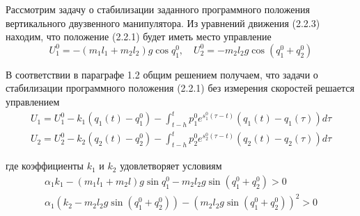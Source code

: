 Рассмотрим задачу о стабилизации заданного программного положения вертикального двузвенного манипулятора. Из уравнений движения (2.2.3) находим, что положение (2.2.1) будет иметь место управление $$U_1^0 = -(m_1 l_1 + m_2 l_2) g \cos q_1^0, \quad U_2^0 = -m_2 l_2 g \cos (q_1^0 + q_2^0)$$

В соответствии в параграфе 1.2 общим решением получаем, что задачи о стабилизации программного положения (2.2.1) без измерения скоростей решается управлением 
$$
\begin{array}{l}
\displaystyle U_1 = U_1^0 - k_1 (q_1(t) - q_1^0) - \int_{t-h}^{t} p_1^0 e^{s_1^0 (\tau - t)} (q_1(t) - q_1(\tau)) d \tau\\
\displaystyle U_2 = U_2^0 - k_2 (q_2(t) - q_2^0) - \int_{t-h}^{t} p_2^0 e^{s_2^0 (\tau - t)} (q_2(t) - q_2(\tau)) d \tau
\end{array}
$$

где коэффициенты $k_1$ и $k_2$ удовлетворяет условиям 
$$
\begin{array}{c}
\alpha_1 k_1 - (m_1 l_1 + m_2 l) g \sin q_1^0 - m_2 l_2 g \sin (q_1^0 + q_2^0) > 0\\
\alpha_1 (k_2 - m_2 l_2 g \sin (q_1^0 + q_2^0)) - (m_2 l_2 g \sin (q_1^0 + q_2^0))^2 > 0
\end{array}
$$
